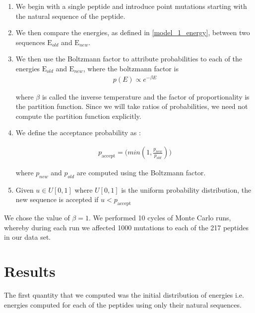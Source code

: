 \documentclass[a4paper, 12pt]{article}
\begin{document}
	\begin{enumerate}
	\item 
	We begin with a single peptide and introduce point mutations starting with the natural sequence of the peptide. 
	\item 
	We then compare the energies, as defined in \eqref{model_1_energy}, between two sequences $\mathrm{E}_{old}$ and $\mathrm{E}_{new}$. 
	\item 
	We then use the Boltzmann factor to attribute probabilities to each of the energies  $\mathrm{E}_{old}$ and $\mathrm{E}_{new}$, where the boltzmann factor is 
	\begin{align}
	\label{boltz}
	p(E) \propto e^{-\beta E}
	\end{align}

	where $\beta$ is called the inverse temperature and the factor of proportionality is the partition function. Since we will take ratios of probabilities, we need not compute the partition function explicitly. 

	\item 
	We define the acceptance probability as :

	\begin{align}
	\label{prob_acceptance}
	p_{\mathrm{accept}} = \mathrm(min(1, \frac{p_{new}}{p_{old}}))
	\end{align}

	where $p_{new}$ and $p_{old}$ are computed using the Boltzmann factor.

	\item 

	Given $u \in U[0,1]$ where $U[0,1]$ is the uniform probability distribution, the new sequence is accepted if $ u < p_{\mathrm{accept}}$
	\end{enumerate}

	We chose the value of $\beta=1$. We performed 10 cycles of Monte Carlo runs, whereby during each run we affected 1000 mutations to each of the 217 peptides in our data set. 

 	\section{Results}

 	The first quantity that we computed was the initial distribution of energies i.e. energies computed for each of the peptides using only their natural sequences. 
\end{document}
